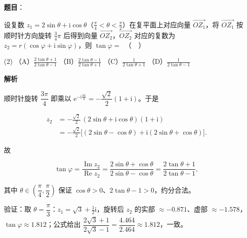 \begin{answer}

\textbf{题目}：

设复数 $z_1 = 2\sin\theta + \mathrm{i}\cos\theta$（$\frac{\pi}{4} < \theta < \frac{\pi}{2}$）在复平面上对应向量 $\overrightarrow{OZ_1}$，将 $\overrightarrow{OZ_1}$ 按顺时针方向旋转 $\frac{3}{4}\pi$ 后得到向量 $\overrightarrow{OZ_2}$，$\overrightarrow{OZ_2}$ 对应的复数为 $z_2 = r(\cos\varphi + \mathrm{i}\sin\varphi)$，则 $\tan\varphi =$　（　）

\begin{gkopts}(2)
\task （A）$\frac{2\tan\theta + 1}{2\tan\theta - 1}$
\task （B）$\frac{2\tan\theta - 1}{2\tan\theta + 1}$
\task （C）$\frac{1}{2\tan\theta + 1}$
\task （D）$\frac{1}{2\tan\theta - 1}$
\end{gkopts}

\textbf{解析}

顺时针旋转 $\dfrac{3\pi}{4}$ 即乘以 $\mathrm e^{-\mathrm i\frac{3\pi}{4}}=-\dfrac{\sqrt2}{2}(1+\mathrm i)$。于是

\nopagebreak[4]
\[\begin{aligned}
z_2&=-\frac{\sqrt2}{2}\,(2\sin\theta+\mathrm i\cos\theta)(1+\mathrm i)\\
&=-\frac{\sqrt2}{2}\Big[(2\sin\theta-\cos\theta)+\mathrm i(2\sin\theta+\cos\theta)\Big].
\end{aligned}\]

故

\nopagebreak[4]
\[\tan\varphi=\frac{\operatorname{Im}z_2}{\operatorname{Re}z_2}=\frac{2\sin\theta+\cos\theta}{2\sin\theta-\cos\theta}=\frac{2\tan\theta+1}{2\tan\theta-1},\]

其中 $\theta\in\left(\dfrac\pi4,\dfrac\pi2\right)$ 保证 $\cos\theta>0$、$2\tan\theta-1>0$，约分合法。

验证：取 $\theta=\dfrac\pi3$：$z_1=\sqrt3+\tfrac12\mathrm i$，旋转后 $z_2$ 的实部 $\approx-0.871$、虚部 $\approx-1.578$，$\tan\varphi\approx1.812$；公式给出 $\dfrac{2\sqrt3+1}{2\sqrt3-1}=\dfrac{4.464}{2.464}\approx1.812$，一致。


\par\medskip

\end{answer}
